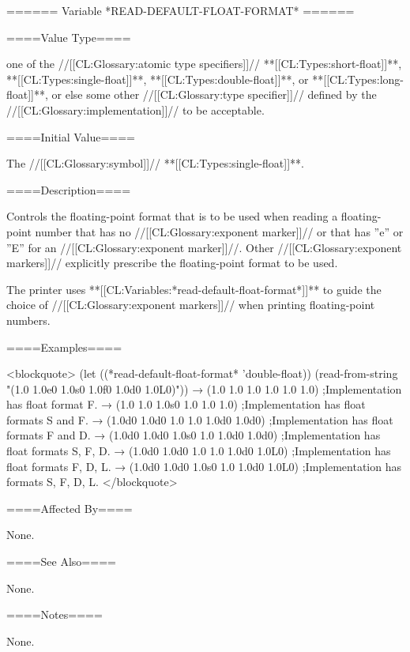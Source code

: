 ====== Variable *READ-DEFAULT-FLOAT-FORMAT* ======

====Value Type====

one of the //[[CL:Glossary:atomic type specifiers]]// **[[CL:Types:short-float]]**, **[[CL:Types:single-float]]**, **[[CL:Types:double-float]]**, or **[[CL:Types:long-float]]**, or else some other //[[CL:Glossary:type specifier]]// defined by the //[[CL:Glossary:implementation]]// to be acceptable.

====Initial Value====

The //[[CL:Glossary:symbol]]// **[[CL:Types:single-float]]**.

====Description====

Controls the floating-point format that is to be used when reading a floating-point number that has no //[[CL:Glossary:exponent marker]]// or that has ''e'' or ''E'' for an //[[CL:Glossary:exponent marker]]//. Other //[[CL:Glossary:exponent markers]]// explicitly prescribe the floating-point format to be used.

The printer uses **[[CL:Variables:*read-default-float-format*]]** to guide the choice of //[[CL:Glossary:exponent markers]]// when printing floating-point numbers.

====Examples====

<blockquote> (let ((*read-default-float-format* 'double-float)) (read-from-string "(1.0 1.0e0 1.0s0 1.0f0 1.0d0 1.0L0)")) → (1.0 1.0 1.0 1.0 1.0 1.0) ;Implementation has float format F. → (1.0 1.0 1.0s0 1.0 1.0 1.0) ;Implementation has float formats S and F. → (1.0d0 1.0d0 1.0 1.0 1.0d0 1.0d0) ;Implementation has float formats F and D. → (1.0d0 1.0d0 1.0s0 1.0 1.0d0 1.0d0) ;Implementation has float formats S, F, D. → (1.0d0 1.0d0 1.0 1.0 1.0d0 1.0L0) ;Implementation has float formats F, D, L. → (1.0d0 1.0d0 1.0s0 1.0 1.0d0 1.0L0) ;Implementation has formats S, F, D, L. </blockquote>

====Affected By====

None.

====See Also====

None.

====Notes====

None.

